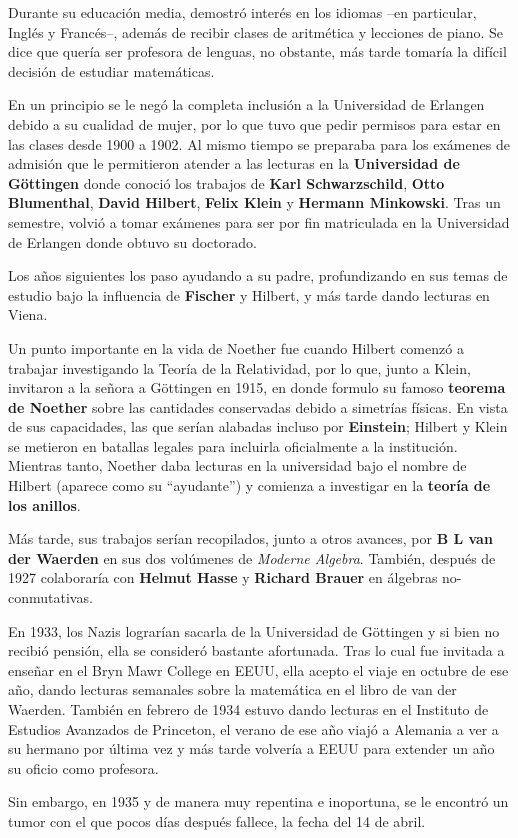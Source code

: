 \documentclass[11pt,oneside]{book}
\begin{document}
Durante su educación media, demostró interés en los idiomas --en particular, Inglés y Francés--, además de recibir clases de aritmética y lecciones de piano. Se dice que quería ser profesora de lenguas, no obstante, más tarde tomaría la difícil decisión de estudiar matemáticas.

En un principio se le negó la completa inclusión a la Universidad de Erlangen debido a su cualidad de mujer, por lo que tuvo que pedir permisos para estar en las clases desde 1900 a 1902. Al mismo tiempo se preparaba para los exámenes de admisión que le permitieron atender a las lecturas en la \textbf{Universidad de Göttingen} donde conoció los trabajos de \textbf{Karl Schwarzschild}, \textbf{Otto Blumenthal}, \textbf{David Hilbert}, \textbf{Felix Klein} y \textbf{Hermann Minkowski}. Tras un semestre, volvió a tomar exámenes para ser por fin matriculada en la Universidad de Erlangen donde obtuvo su doctorado.

Los años siguientes los paso ayudando a su padre, profundizando en sus temas de estudio bajo la influencia de \textbf{Fischer} y Hilbert, y más tarde dando lecturas en Viena.

Un punto importante en la vida de Noether fue cuando Hilbert comenzó a trabajar investigando la Teoría de la Relatividad, por lo que, junto a Klein, invitaron a la señora a Göttingen en 1915, en donde formulo su famoso \textbf{teorema de Noether} sobre las cantidades conservadas debido a simetrías físicas. En vista de sus capacidades, las que serían alabadas incluso por \textbf{Einstein}; Hilbert y Klein se metieron en batallas legales para incluirla oficialmente a la institución. Mientras tanto, Noether daba lecturas en la universidad bajo el nombre de Hilbert (aparece como su ``ayudante'') y comienza a investigar en la \textbf{teoría de los anillos}.

Más tarde, sus trabajos serían recopilados, junto a otros avances, por \textbf{B L van der Waerden} en sus dos volúmenes de \textit{Moderne Algebra}. También, después de 1927 colaboraría con \textbf{Helmut Hasse} y \textbf{Richard Brauer} en álgebras no-conmutativas.

En 1933, los Nazis lograrían sacarla de la Universidad de Göttingen y si bien no recibió pensión, ella se consideró bastante afortunada. Tras lo cual fue invitada a enseñar en el Bryn Mawr College en EEUU, ella acepto el viaje en octubre de ese año, dando lecturas semanales sobre la matemática en el libro de van der Waerden. También en febrero de 1934 estuvo dando lecturas en el Instituto de Estudios Avanzados de Princeton, el verano de ese año viajó a Alemania a ver a su hermano por última vez y más tarde volvería a EEUU para extender un año su oficio como profesora.

Sin embargo, en 1935 y de manera muy repentina e inoportuna, se le encontró un tumor con el que pocos días después fallece, la fecha del 14 de abril.

\printindex
\printnomenclature

\nocite{*}
\printbibliography[heading=bibintoc]
\end{document}
